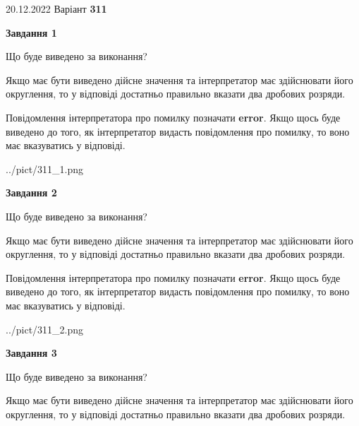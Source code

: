 \documentclass[12pt, ukrainian]{article}
\begin{document}
{20.12.2022 Варіант \No \textbf { 311 }\par}
{
\begin {Large}

{\begin {center}\textbf{Завдання 1}\end {center}}\par
Що буде виведено за виконання? \par

Якщо має бути виведено дійсне значення та інтерпретатор має здійснювати його округлення, 
то у відповіді достатньо правильно вказати два дробових розряди.

Повідомлення інтерпретатора про помилку позначати \textbf{error}.
Якщо щось буде виведено до того, як інтерпретатор видасть повідомлення про помилку, 
то воно має вказуватись у відповіді. \par

\begin{center}
	{../pict/311_1.png}
\end{center}
\newpage

{\begin {center}\textbf{Завдання 2}\end {center}}\par
Що буде виведено за виконання? \par

Якщо має бути виведено дійсне значення та інтерпретатор має здійснювати його округлення, 
то у відповіді достатньо правильно вказати два дробових розряди.

Повідомлення інтерпретатора про помилку позначати \textbf{error}.
Якщо щось буде виведено до того, як інтерпретатор видасть повідомлення про помилку, 
то воно має вказуватись у відповіді. \par

\begin{center}
	{../pict/311_2.png}
\end{center}
\newpage

{\begin {center}\textbf{Завдання 3}\end {center}}\par
Що буде виведено за виконання? \par

Якщо має бути виведено дійсне значення та інтерпретатор має здійснювати його округлення, 
то у відповіді достатньо правильно вказати два дробових розряди.


\end{Large}}
\end{document}
